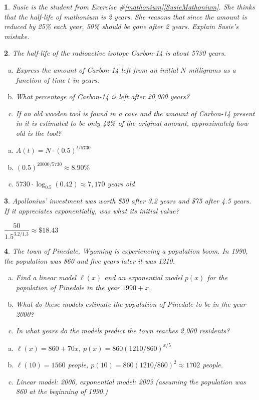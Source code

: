 \documentclass{amsbook}
\newcommand{\ssp}{\begin{enumerate}[(a), leftmargin=*]}
\newcommand{\esp}{\end{enumerate}}
\newtheorem{exc}{}
\newenvironment{ex}{\begin{exc}\normalfont}{\end{exc}}
\numberwithin{section}{chapter}
\numberwithin{equation}{chapter}
\begin{document}
\begin{ex}
	Susie is the student from Exercise \#\ref{mathonium}\ref{SusieMathonium}. She thinks that the half-life of mathonium is 2 years. She reasons that since the amount is reduced by 25\% each year, 50\% should be gone after 2 years. Explain Susie's mistake.
\end{ex}


\begin{ex}
	The half-life of the radioactive isotope Carbon-14 is about 5730 years.
	\ssp
	\item Express the amount of Carbon-14 left from an initial $N$ milligrams as a function of time $t$ in years.
	\item What percentage of Carbon-14 is left after 20,000 years?
	\item If an old wooden tool is found in a cave and the amount of Carbon-14 present in it is estimated to be only 42\% of the original amount, approximately how old is the tool?	
	\esp
	\begin{sol}
		\ssp
	\item $A(t) = N\cdot (0.5)^{t/5730}$
	\item $(0.5)^{20000/5730} \approx 8.90\%$
	\item $5730\cdot\log_{0.5}(0.42) \approx 7,170$ years old
	\esp
	\end{sol}
\end{ex}

\begin{ex}
	Apollonius' investment was worth \$50 after 3.2 years and \$75 after 4.5 years. If it appreciates exponentially, was what its initial value?
	\begin{sol}
		$ \dfrac{50}{1.5^{3.2/1.3}} \approx \$18.43 $
	\end{sol}
\end{ex}

\begin{ex} %
	The town of Pinedale, Wyoming is experiencing a population boom. In 1990, the population was 860 and five years later it was 1210.
	\ssp
	\item Find a linear model $\ell(x)$ and an exponential model $p(x)$ for the population of Pinedale in the year $1990+x$.
	\item 		What do these models estimate the population of Pinedale to be in the year 2000?
	\item In what years do the models predict the town reaches 2,000 residents?
	\esp
	\begin{sol}
	\ssp
\item $\ell(x) = 860+70x$, $p(x) = 860 (1210/860)^{x/5}$
\item $\ell(10) = 1560$ people, $p(10) = 860 (1210/860)^{2} \approx 1702$ people.
\item Linear model: 2006, exponential model: 2003 (assuming the population was 860 at the beginning of 1990.)
\esp
	\end{sol}
\end{ex}
\end{document}
